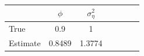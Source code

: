 \begin{tabular}{lcccccc}
\toprule
& $\phi$ & $\sigma_\eta^2$ \\
\midrule
True & 0.9 & 1 \\
Estimate & 0.8489 & 1.3774 \\
\bottomrule
\end{tabular}
